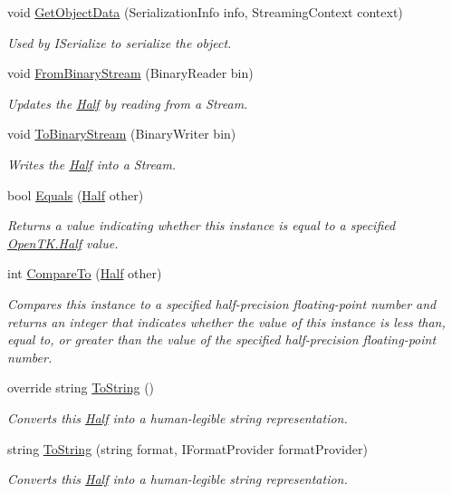 \begin{DoxyCompactItemize}
void \hyperlink{struct_open_t_k_1_1_half_a94663b59e8098e475c0a3b0b9bc8f5a4}{Get\-Object\-Data} (Serialization\-Info info, Streaming\-Context context)
\begin{DoxyCompactList}\small\item\em Used by I\-Serialize to serialize the object.\end{DoxyCompactList}\item 
void \hyperlink{struct_open_t_k_1_1_half_af7d15c9bfab9590a8363ae1524cdc1c9}{From\-Binary\-Stream} (Binary\-Reader bin)
\begin{DoxyCompactList}\small\item\em Updates the \hyperlink{struct_open_t_k_1_1_half}{Half} by reading from a Stream.\end{DoxyCompactList}\item 
void \hyperlink{struct_open_t_k_1_1_half_a18561108983fc9989c05467009143e7c}{To\-Binary\-Stream} (Binary\-Writer bin)
\begin{DoxyCompactList}\small\item\em Writes the \hyperlink{struct_open_t_k_1_1_half}{Half} into a Stream.\end{DoxyCompactList}\item 
bool \hyperlink{struct_open_t_k_1_1_half_adc727f01fd20b0c0e771f9792effa74a}{Equals} (\hyperlink{struct_open_t_k_1_1_half}{Half} other)
\begin{DoxyCompactList}\small\item\em Returns a value indicating whether this instance is equal to a specified \hyperlink{struct_open_t_k_1_1_half}{Open\-T\-K.\-Half} value. \end{DoxyCompactList}\item 
int \hyperlink{struct_open_t_k_1_1_half_a1afb59496dff653e567c5a0bc45b8da9}{Compare\-To} (\hyperlink{struct_open_t_k_1_1_half}{Half} other)
\begin{DoxyCompactList}\small\item\em Compares this instance to a specified half-\/precision floating-\/point number and returns an integer that indicates whether the value of this instance is less than, equal to, or greater than the value of the specified half-\/precision floating-\/point number. \end{DoxyCompactList}\item 
override string \hyperlink{struct_open_t_k_1_1_half_a5153a96aaf848da185f5d1b169c595c2}{To\-String} ()
\begin{DoxyCompactList}\small\item\em Converts this \hyperlink{struct_open_t_k_1_1_half}{Half} into a human-\/legible string representation.\end{DoxyCompactList}\item 
string \hyperlink{struct_open_t_k_1_1_half_a376ec7e36a73d0f7c947c7fa9a6bba94}{To\-String} (string format, I\-Format\-Provider format\-Provider)
\begin{DoxyCompactList}\small\item\em Converts this \hyperlink{struct_open_t_k_1_1_half}{Half} into a human-\/legible string representation.\end{DoxyCompactList}\end{DoxyCompactItemize}
